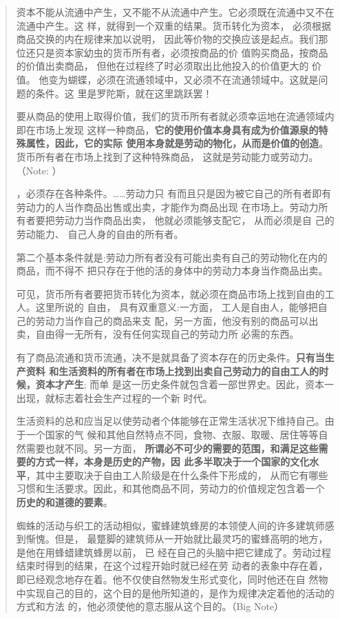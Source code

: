 \begin{quotation}
资本不能从流通中产生，又不能不从流通中产生。它必须既在流通中又不在流通中产生。这
样，就得到一个双重的结果。货币转化为资本， 必须根据商品交换的内在规律来加以说明，
因此等价物的交换应该是起点。我们那位还只是资本家幼虫的货币所有者，必须按商品的价
值购买商品，按商品的价值出卖商品， 但他在过程终了时必须取出比他投入的价值更大的
价值。 他变为蝴蝶，必须在流通领域中，又必须不在流通领域中。这就是问题的条件。这
里是罗陀斯，就在这里跳跃罢！

要从商品的使用上取得价值，我们的货币所有者就必须幸运地在流通领域内即在市场上发现
这样一种商品，\textbf{它的使用价值本身具有成为价值源泉的特殊属性，因此，它的实际
使用本身就是劳动的物化，从而是价值的创造}。货币所有者在市场上找到了这种特殊商品，
这就是劳动能力或劳动力。（Note: ）

，必须存在各种条件。……劳动力只
有而且只是因为被它自己的所有者即有劳动力的人当作商品出售或出卖，才能作为商品出现
在市场上。劳动力所有者要把劳动力当作商品出卖， 他就必须能够支配它， 从而必须是自
己的劳动能力、 自己人身的自由的所有者。

第二个基本条件就是:劳动力所有者没有可能出卖有自己的劳动物化在内的商品，而不得不
把只存在于他的活的身体中的劳动力本身当作商品出卖。

可见，货币所有者要把货币转化为资本，就必须在商品市场上找到自由的工人。这里所说的
自由， 具有双重意义:一方面， 工人是自由人，能够把自己的劳动力当作自己的商品来支
配，另一方面，他没有别的商品可以出卖，自由得一无所有，没有任何实现自己的劳动力所
必需的东西。

\bigskip

有了商品流通和货币流通，决不是就具备了资本存在的历史条件。\textbf{只有当生产资料
和生活资料的所有者在市场上找到出卖自己劳动力的自由工人的时候，资本才产生}; 而单
是这一历史条件就包含着一部世界史。因此，资本一出现，就标志着社会生产过程的一个新
时代。

生活资料的总和应当足以使劳动者个体能够在正常生活状况下维持自己。由于一个国家的气
候和其他自然特点不同，食物、衣服、取暖、居住等等自然需要也就不同。另一方面，
\textbf{所谓必不可少的需要的范围，和满足这些需要的方式一样，本身是历史的产物，因
此多半取决于一个国家的文化水平}，其中主要取决于自由工人阶级是在什么条件下形成的，
从而它有哪些习惯和生活要求。因此，和其他商品不同，劳动力的价值规定包含着一个
\textbf{历史的和道德的要素}。

蜘蛛的活动与织工的活动相似，蜜蜂建筑蜂房的本领使人间的许多建筑师感到惭愧。但是，
最蹩脚的建筑师从一开始就比最灵巧的蜜蜂高明的地方， 是他在用蜂蜡建筑蜂房以前， 已
经在自己的头脑中把它建成了。劳动过程结束时得到的结果，在这个过程开始时就已经在劳
动者的表象中存在着，即已经观念地存在着。他不仅使自然物发生形式变化，同时他还在自
然物中实现自己的目的，这个目的是他所知道的，是作为规律决定着他的活动的方式和方法
的，他必须使他的意志服从这个目的。（Big Note）


\end{quotation}

